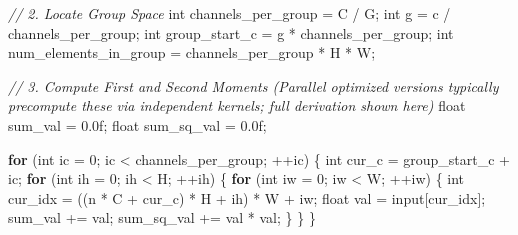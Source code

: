 \documentclass[
  10
]{article}
\newenvironment{Shaded}{}{}
\newcommand{\BuiltInTok}[1]{\textcolor[rgb]{0.00,0.50,0.00}{#1}}
\newcommand{\CommentTok}[1]{\textcolor[rgb]{0.38,0.63,0.69}{\textit{#1}}}
\newcommand{\ControlFlowTok}[1]{\textcolor[rgb]{0.00,0.44,0.13}{\textbf{#1}}}
\newcommand{\DataTypeTok}[1]{\textcolor[rgb]{0.56,0.13,0.00}{#1}}
\newcommand{\DecValTok}[1]{\textcolor[rgb]{0.25,0.63,0.44}{#1}}
\newcommand{\FloatTok}[1]{\textcolor[rgb]{0.25,0.63,0.44}{#1}}
\newcommand{\NormalTok}[1]{#1}
\newcommand{\OperatorTok}[1]{\textcolor[rgb]{0.40,0.40,0.40}{#1}}
\begin{document}
\begin{Shaded}
\begin{Highlighting}[]
\CommentTok{// 2. Locate Group Space}
\DataTypeTok{int}\NormalTok{ channels\_per\_group }\OperatorTok{=}\NormalTok{ C }\OperatorTok{/}\NormalTok{ G}\OperatorTok{;}
\DataTypeTok{int}\NormalTok{ g }\OperatorTok{=}\NormalTok{ c }\OperatorTok{/}\NormalTok{ channels\_per\_group}\OperatorTok{;}
\DataTypeTok{int}\NormalTok{ group\_start\_c }\OperatorTok{=}\NormalTok{ g }\OperatorTok{*}\NormalTok{ channels\_per\_group}\OperatorTok{;}
\DataTypeTok{int}\NormalTok{ num\_elements\_in\_group }\OperatorTok{=}\NormalTok{ channels\_per\_group }\OperatorTok{*}\NormalTok{ H }\OperatorTok{*}\NormalTok{ W}\OperatorTok{;}

\CommentTok{// 3. Compute First and Second Moments (Parallel optimized versions typically precompute these via independent kernels; full derivation shown here)}
\DataTypeTok{float}\NormalTok{ sum\_val }\OperatorTok{=} \FloatTok{0.0}\BuiltInTok{f}\OperatorTok{;}
\DataTypeTok{float}\NormalTok{ sum\_sq\_val }\OperatorTok{=} \FloatTok{0.0}\BuiltInTok{f}\OperatorTok{;}

\ControlFlowTok{for} \OperatorTok{(}\DataTypeTok{int}\NormalTok{ ic }\OperatorTok{=} \DecValTok{0}\OperatorTok{;}\NormalTok{ ic }\OperatorTok{\textless{}}\NormalTok{ channels\_per\_group}\OperatorTok{;} \OperatorTok{++}\NormalTok{ic}\OperatorTok{)} \OperatorTok{\{}
    \DataTypeTok{int}\NormalTok{ cur\_c }\OperatorTok{=}\NormalTok{ group\_start\_c }\OperatorTok{+}\NormalTok{ ic}\OperatorTok{;}
    \ControlFlowTok{for} \OperatorTok{(}\DataTypeTok{int}\NormalTok{ ih }\OperatorTok{=} \DecValTok{0}\OperatorTok{;}\NormalTok{ ih }\OperatorTok{\textless{}}\NormalTok{ H}\OperatorTok{;} \OperatorTok{++}\NormalTok{ih}\OperatorTok{)} \OperatorTok{\{}
    \ControlFlowTok{for} \OperatorTok{(}\DataTypeTok{int}\NormalTok{ iw }\OperatorTok{=} \DecValTok{0}\OperatorTok{;}\NormalTok{ iw }\OperatorTok{\textless{}}\NormalTok{ W}\OperatorTok{;} \OperatorTok{++}\NormalTok{iw}\OperatorTok{)} \OperatorTok{\{}
    \DataTypeTok{int}\NormalTok{ cur\_idx }\OperatorTok{=} \OperatorTok{((}\NormalTok{n }\OperatorTok{*}\NormalTok{ C }\OperatorTok{+}\NormalTok{ cur\_c}\OperatorTok{)} \OperatorTok{*}\NormalTok{ H }\OperatorTok{+}\NormalTok{ ih}\OperatorTok{)} \OperatorTok{*}\NormalTok{ W }\OperatorTok{+}\NormalTok{ iw}\OperatorTok{;}
    \DataTypeTok{float}\NormalTok{ val }\OperatorTok{=}\NormalTok{ input}\OperatorTok{[}\NormalTok{cur\_idx}\OperatorTok{];}
\NormalTok{    sum\_val }\OperatorTok{+=}\NormalTok{ val}\OperatorTok{;}
\NormalTok{    sum\_sq\_val }\OperatorTok{+=}\NormalTok{ val }\OperatorTok{*}\NormalTok{ val}\OperatorTok{;}
    \OperatorTok{\}}
    \OperatorTok{\}}
\OperatorTok{\}}


\end{Highlighting}
\end{Shaded}
\end{document}
